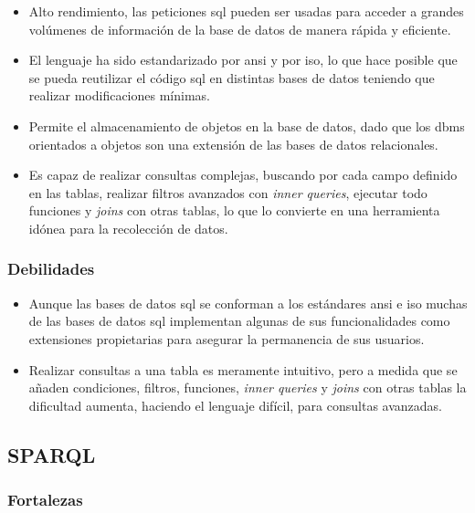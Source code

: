 \begin{itemize}
	\item Alto rendimiento, las peticiones \acrshort{sql} pueden ser usadas para acceder a grandes volúmenes de información de la base de datos de manera rápida y eficiente.

	\item El lenguaje ha sido estandarizado por \acrshort{ansi} y por \acrshort{iso}, lo que hace posible que se pueda reutilizar el código \acrshort{sql} en distintas bases de datos teniendo que realizar modificaciones mínimas.

	\item Permite el almacenamiento de objetos en la base de datos, dado que los \acrshort{dbms} orientados a objetos\cite{OODB} son una extensión de las bases de datos relacionales.

	\item Es capaz de realizar consultas complejas, buscando por cada campo definido en las tablas, realizar filtros avanzados con \textit{inner queries}, ejecutar todo funciones y \textit{joins} con otras tablas, lo que lo convierte en una herramienta idónea para la recolección de datos.
\end{itemize}

\subsubsection{Debilidades}

\begin{itemize}
	\item Aunque las bases de datos \acrshort{sql} se conforman a los estándares \acrshort{ansi} e \acrshort{iso} muchas de las bases de datos \acrshort{sql} implementan algunas de sus funcionalidades como extensiones propietarias para asegurar la permanencia de sus usuarios.

	\item Realizar consultas a una tabla es meramente intuitivo, pero a medida que se añaden condiciones, filtros, funciones, \textit{inner queries} y \textit{joins} con otras tablas la dificultad aumenta, haciendo el lenguaje difícil, para consultas avanzadas.
\end{itemize}

\subsection{SPARQL}

\subsubsection{Fortalezas}

